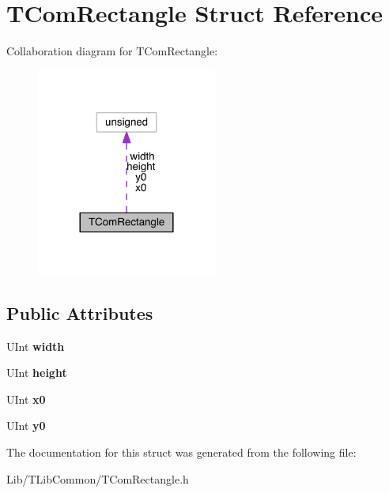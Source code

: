 \hypertarget{struct_t_com_rectangle}{}\section{T\+Com\+Rectangle Struct Reference}
\label{struct_t_com_rectangle}


Collaboration diagram for T\+Com\+Rectangle\+:
\nopagebreak
\begin{figure}[H]
\begin{center}
\leavevmode
\includegraphics[width=168pt]{de/df0/struct_t_com_rectangle__coll__graph}
\end{center}
\end{figure}
\subsection*{Public Attributes}
\begin{DoxyCompactItemize}
\item 
\mbox{\label{struct_t_com_rectangle_ad690f8a2debedbeaa3ff4bf77b1abdb4}} 
U\+Int {\bfseries width}
\item 
\mbox{\label{struct_t_com_rectangle_adb76c4d43a9ff3de091f149e2d56f1d5}} 
U\+Int {\bfseries height}
\item 
\mbox{\label{struct_t_com_rectangle_a9b0cdb7c521ddeacafd6364d6c5d701d}} 
U\+Int {\bfseries x0}
\item 
\mbox{\label{struct_t_com_rectangle_a551b8cbfee2e24e4de68ee45ec561319}} 
U\+Int {\bfseries y0}
\end{DoxyCompactItemize}


The documentation for this struct was generated from the following file\+:\begin{DoxyCompactItemize}
\item 
Lib/\+T\+Lib\+Common/T\+Com\+Rectangle.\+h\end{DoxyCompactItemize}
